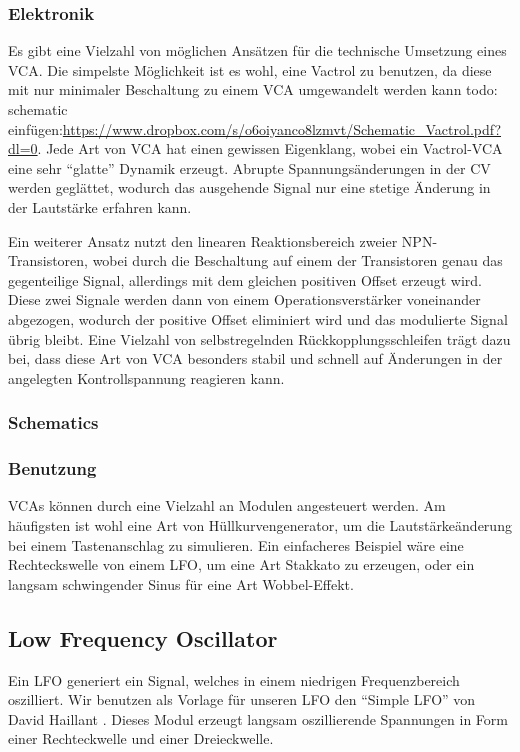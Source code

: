 \subsubsection{Elektronik}
\label{sec:orgdbe75c0}
Es gibt eine Vielzahl von möglichen Ansätzen für die technische Umsetzung eines \ac{VCA}. Die simpelste Möglichkeit ist es wohl, eine Vactrol zu benutzen, da diese mit nur minimaler Beschaltung zu einem VCA umgewandelt werden kann todo: schematic einfügen:\url{https://www.dropbox.com/s/o6oiyanco8lzmvt/Schematic\_Vactrol.pdf?dl=0}. Jede Art von \ac{VCA} hat einen gewissen Eigenklang, wobei ein Vactrol-VCA eine sehr "`glatte"' Dynamik erzeugt. Abrupte Spannungsänderungen in der \acl{CV} werden geglättet, wodurch das ausgehende Signal nur eine stetige Änderung in der Lautstärke erfahren kann.

Ein weiterer Ansatz nutzt den linearen Reaktionsbereich zweier NPN-Transistoren, wobei durch die Beschaltung auf einem der Transistoren genau das gegenteilige Signal, allerdings mit dem gleichen positiven Offset erzeugt wird. Diese zwei Signale werden dann von einem Operationsverstärker voneinander abgezogen, wodurch der positive Offset eliminiert wird und das modulierte Signal übrig bleibt. Eine Vielzahl von selbstregelnden Rückkopplungsschleifen trägt dazu bei, dass diese Art von \ac{VCA} besonders stabil und schnell auf Änderungen in der angelegten Kontrollspannung reagieren kann.
\subsubsection{Schematics}
\label{sec:org1b39f69}
\subsubsection{Benutzung}
\label{sec:org1f3461d}
\acp{VCA} können durch eine Vielzahl an Modulen angesteuert werden. Am häufigsten ist wohl eine Art von Hüllkurvengenerator, um die Lautstärkeänderung bei einem Tastenanschlag zu simulieren. Ein einfacheres Beispiel wäre eine Rechteckswelle von einem LFO, um eine Art Stakkato zu erzeugen, oder ein langsam schwingender Sinus für eine Art Wobbel-Effekt.
\subsection{Low Frequency Oscillator \label{LFO}}
\label{sec:orgad8da16}

Ein \ac{LFO} generiert ein Signal, welches in einem niedrigen Frequenzbereich oszilliert. Wir benutzen als Vorlage für unseren \ac{LFO} den "`Simple LFO"' von David Haillant \cite{haillant:lfo}. Dieses Modul erzeugt langsam oszillierende Spannungen in Form einer Rechteckwelle und einer Dreieckwelle.

